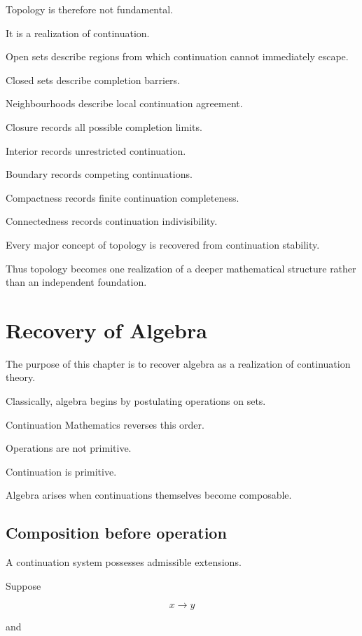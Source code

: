 \documentclass[13pt,openany]{book}
\theoremstyle{plain}
\theoremstyle{definition}
\begin{document}
Topology is therefore not fundamental.

It is a realization of continuation.

Open sets describe regions from which continuation cannot immediately escape.

Closed sets describe completion barriers.

Neighbourhoods describe local continuation agreement.

Closure records all possible completion limits.

Interior records unrestricted continuation.

Boundary records competing continuations.

Compactness records finite continuation completeness.

Connectedness records continuation indivisibility.

Every major concept of topology is recovered from continuation stability.

Thus topology becomes one realization of a deeper mathematical structure rather than an independent foundation.

\chapter{Recovery of Algebra}

The purpose of this chapter is to recover algebra as a realization of continuation theory.

Classically, algebra begins by postulating operations on sets.

Continuation Mathematics reverses this order.

Operations are not primitive.

Continuation is primitive.

Algebra arises when continuations themselves become composable.

\section{Composition before operation}

A continuation system possesses admissible extensions.

Suppose

\[
x
\longrightarrow
y
\]

and
\end{document}
